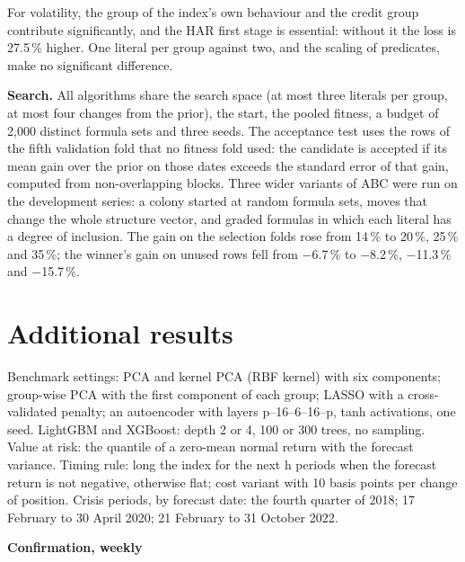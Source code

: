 \documentclass[review]{elsarticle}
\begin{document}




For volatility, the group of the index's own behaviour and the credit group contribute significantly, and the HAR first stage is essential: without it the loss is 27.5\,\% higher. One literal per group against two, and the scaling of predicates, make no significant difference.



\textbf{Search.} All algorithms share the search space (at most three literals per group, at most four changes from the prior), the start, the pooled fitness, a budget of 2,000 distinct formula sets and three seeds. The acceptance test uses the rows of the fifth validation fold that no fitness fold used: the candidate is accepted if its mean gain over the prior on those dates exceeds the standard error of that gain, computed from non-overlapping blocks. Three wider variants of ABC were run on the development series: a colony started at random formula sets, moves that change the whole structure vector, and graded formulas in which each literal has a degree of inclusion. The gain on the selection folds rose from 14\,\% to 20\,\%, 25\,\% and 35\,\%; the winner's gain on unused rows fell from \ensuremath{-}6.7\,\% to \ensuremath{-}8.2\,\%, \ensuremath{-}11.3\,\% and \ensuremath{-}15.7\,\%.

\section{Additional results}\label{app:E}

\setcounter{table}{0}

Benchmark settings: PCA and kernel PCA (RBF kernel) with six components; group-wise PCA with the first component of each group; LASSO with a cross-validated penalty; an autoencoder with layers p--16--6--16--p, tanh activations, one seed. LightGBM and XGBoost: depth 2 or 4, 100 or 300 trees, no sampling. Value at risk: the quantile of a zero-mean normal return with the forecast variance. Timing rule: long the index for the next h periods when the forecast return is not negative, otherwise flat; cost variant with 10 basis points per change of position. Crisis periods, by forecast date: the fourth quarter of 2018; 17 February to 30 April 2020; 21 February to 31 October 2022.

\medskip\noindent \textbf{Confirmation, weekly}


\end{document}
